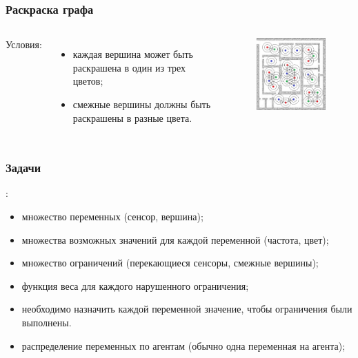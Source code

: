\documentclass{beamer}
\begin{document}
\begin{frame}
  \frametitle{Раскраска графа}
  \begin{columns}[c]
    Условия:
    \begin{itemize}
      \item каждая вершина может быть раскрашена в один из трех цветов;
      \item смежные вершины должны быть раскрашены в разные цвета.
    \end{itemize}

    \begin{figure}
       \includegraphics[width=5cm]{images/graph-coloring.jpg}
    \end{figure}
  \end{columns}
\end{frame}

\begin{frame}
  \frametitle{Задачи }
   :
  \begin{itemize}
    \item<1-> множество переменных (сенсор, вершина);
    \item<2-> множества возможных значений для каждой переменной (частота, цвет);
    \item<3-> множество ограничений (перекающиеся сенсоры, смежные вершины);
    \item<5-| alert@6> функция веса для каждого нарушенного ограничения;
    \item<4-> необходимо 
      {назначить каждой переменной значение, чтобы ограничения были выполнены}.
    \item<6-> распределение переменных по агентам (обычно одна переменная на агента);
  \end{itemize}
\end{frame}
\end{document}
